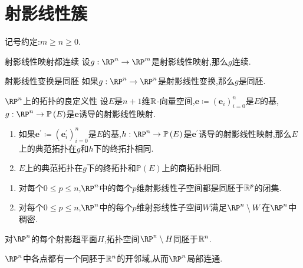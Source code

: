 \section{射影线性簇}

记号约定:$m\geq n\geq 0$.

\begin{proposition}{射影线性映射都连续}{}
	设$g:\RP^{n}\to\RP^{m}$是射影线性映射,那么$g$连续.
\end{proposition}

\begin{corollary}{射影线性变换是同胚}{}
	如果$g:\RP^{n}\to\RP^{n}$是射影线性变换,那么$g$是同胚.
\end{corollary}

\begin{proposition}{$\RP^{n}$上的拓扑的良定义性}{}
	设$E$是$n+1$维$\mathbb{R}$-向量空间,$\mathbf{e}\coloneq\left(\mathbf{e}_{i}\right)_{i=0}^{n}$是$E$的基,$g:\RP^{n}\to\mathbb{P}\left(E\right)$是$\mathbf{e}$诱导的射影线性映射.
	\begin{enumerate}
		\item 如果$\mathbf{e}^{\prime}\coloneq\left(\mathbf{e}_{i}^{\prime}\right)_{i=0}^{n}$是$E$的基,$h:\RP^{n}\to\mathbb{P}\left(E\right)$是$\mathbf{e}^{\prime}$诱导的射影线性映射,那么$E$上的典范拓扑在$g$和$h$下的终拓扑相同.
		\item $E$上的典范拓扑在$g$下的终拓扑和$\mathbb{P}\left(E\right)$上的商拓扑相同.
	\end{enumerate}
\end{proposition}

\begin{proposition}{}{}
	\begin{enumerate}
		\item 对每个$0\leq p\leq n$,$\RP^{n}$中的每个$p$维射影线性子空间都是同胚于$\mathbb{R}^{p}$的闭集.
		\item 对每个$0\leq p\leq n$,$\RP^{n}$中的每个$p$维射影线性子空间$W$满足$\RP^{n}\setminus W$在$\RP^{n}$中稠密.
	\end{enumerate}
\end{proposition}

\begin{proposition}{}{}
	对$\RP^{n}$的每个射影超平面$H$,拓扑空间$\RP^{n}\setminus H$同胚于$\mathbb{R}^{n}$.
\end{proposition}

\begin{corollary}{}{}
	$\RP^{n}$中各点都有一个同胚于$\mathbb{R}^{n}$的开邻域,从而$\RP^{n}$局部连通.
\end{corollary}